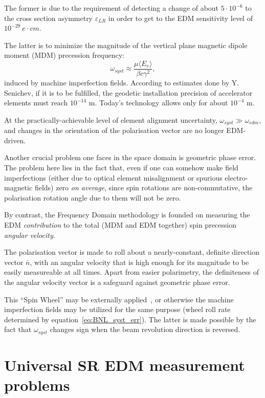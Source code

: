 \documentclass[]{elsarticle}
\newcommand{\w}{\omega}
\newcommand{\nbar}{\bar n}
\newcommand{\avg}[1]{\langle{#1}\rangle}
\newcommand{\wedm}{\w_{edm}}
\begin{document}
The former is due to the requirement of detecting a change of about $5\cdot 10^{-6}$ to the
cross section asymmetry $\varepsilon_{LR}$ in order to get to the EDM sensitivity level
of $10^{-29}~e\cdot cm$.~\cite[p.~18]{BNL:Deuteron2008}

The latter is to minimize the magnitude of the vertical plane magnetic dipole 
moment (MDM) precession frequency:~\cite[p.~11]{BNL:Deuteron2008}
\begin{equation}\label{eq:BNL_syst_err}
  \w_{syst} \approx \frac{\mu\avg{E_v}}{\beta c\gamma^2},
\end{equation}
induced by machine imperfection fields. According to estimates done by Y. Senichev, if it is to be fulfilled,
the geodetic installation precision of accelerator elements must reach $10^{-14}$ m. Today's technology
allows only for about $10^{-4}$ m.

At the practically-achievable level of element alignment uncertainty, $\w_{syst} \gg \wedm$,
and changes in the orientation of the polarisation vector are no longer EDM-driven.

Another crucial problem one faces in the space domain is geometric phase error.~\cite[p.~6]{BNL:Proton}
The problem here lies in the fact that, even if one can somehow make field imperfections (either due to
optical element misalignment or spurious electro-magnetic fields) zero
\emph{on average}, since spin rotations are non-commutative, the polarisation rotation angle due to them
will not be zero.

By contrast, the Frequency Domain methodology is founded on measuring the EDM \emph{contribution} to the total
(MDM and EDM together) spin precession \emph{angular velocity}.

The polarisation vector is made to roll about a nearly-constant, definite direction vector $\nbar$,
with an angular velocity that is high enough for its magnitude to be easily measureable at all times.
Apart from easier polarimetry, the definiteness of the angular velocity vector is a safeguard against geometric
phase error.

This ``Spin Wheel'' may be externally applied~\cite{Koop:SW}, or otherwise the machine imperfection fields
may be utilized for the same purpose (wheel roll rate determined by equation~\eqref{eq:BNL_syst_err}).
The latter is made possible by the fact that $\w_{syst}$ changes sign when the beam revolution direction
is reversed.~\cite[p.~11]{BNL:Deuteron2008}

\section{Universal SR EDM measurement problems}
\end{document}

